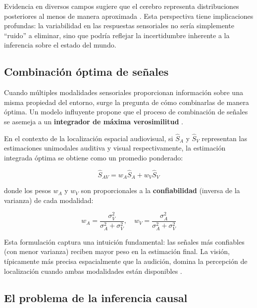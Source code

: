 Evidencia en diversos campos sugiere que el cerebro representa distribuciones posteriores al menos de manera aproximada \citep{echeveste2020cortical}. Esta perspectiva tiene implicaciones profundas: la variabilidad en las respuestas sensoriales no sería simplemente ``ruido'' a eliminar, sino que podría reflejar la incertidumbre inherente a la inferencia sobre el estado del mundo.

\subsection{Combinación óptima de señales}
\label{subsec:combinacion_optima}

Cuando múltiples modalidades sensoriales proporcionan información sobre una misma propiedad del entorno, surge la pregunta de cómo combinarlas de manera óptima. Un modelo influyente propone que el proceso de combinación de señales se asemeja a un \textbf{integrador de máxima verosimilitud} \citep{alais2004ventriloquist}.

En el contexto de la localización espacial audiovisual, si $\hat{S}_A$ y $\hat{S}_V$ representan las estimaciones unimodales auditiva y visual respectivamente, la estimación integrada óptima se obtiene como un promedio ponderado:

\begin{equation}
\hat{S}_{AV} = w_A \hat{S}_A + w_V \hat{S}_V
\label{eq:mle_integration}
\end{equation}

donde los pesos $w_A$ y $w_V$ son proporcionales a la \textbf{confiabilidad} (inversa de la varianza) de cada modalidad:

\begin{equation}
w_A = \frac{\sigma_V^2}{\sigma_A^2 + \sigma_V^2}, \quad w_V = \frac{\sigma_A^2}{\sigma_A^2 + \sigma_V^2}
\label{eq:reliability_weights}
\end{equation}

Esta formulación captura una intuición fundamental: las señales más confiables (con menor varianza) reciben mayor peso en la estimación final. La visión, típicamente más precisa espacialmente que la audición, domina la percepción de localización cuando ambas modalidades están disponibles \citep{paredes2025scikit}.

\subsection{El problema de la inferencia causal}
\label{subsec:inferencia_causal}

